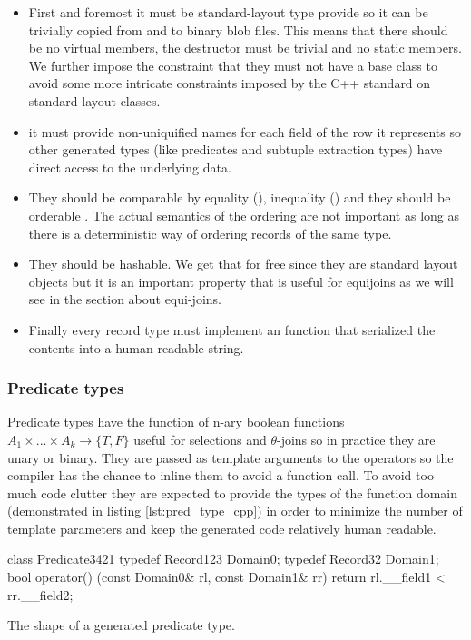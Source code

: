 \begin{itemize}
\item First and foremost it must be standard-layout type provide so it can
be trivially copied from and to binary blob files. This means that
there should be no virtual members, the destructor must be trivial
and no static members. We further impose the constraint that they
must not have a base class to avoid some more intricate constraints
imposed by the C++ standard on standard-layout classes.
\item it must provide non-uniquified names for each field of the row it
represents so other generated types (like predicates and subtuple
extraction types) have direct access to the underlying data.
\item They should be comparable by equality (\cpp{==}), inequality (\cpp{!=}) and
they should be orderable \cpp{<}. The actual semantics of the ordering
are not important as long as there is a deterministic way of
ordering records of the same type.
\item They should be hashable. We get that for free since they are
standard layout objects but it is an important property that is
useful for equijoins as we will see in the section about equi-joins.
\item Finally every record type must implement an 
function that serialized the contents into a human readable string.
\end{itemize}

\subsubsection{Predicate types}

Predicate types have the function of n-ary boolean functions \(A_1
\times ... \times A_k \to \{T,F\}\) useful for selections and
\(\theta\)-joins so in practice they are unary or binary. They are
passed as template arguments to the operators so the compiler has the
chance to inline them to avoid a function call. To avoid too much code
clutter they are expected to provide the types of the function domain
(demonstrated in listing \ref{lst:pred_type_cpp}) in order to minimize
the number of template parameters and keep the generated code
relatively human readable.

\begin{code}
\begin{cppcode}
class Predicate3421 {
  typedef Record123 Domain0;
  typedef Record32 Domain1;
  bool operator() (const Domain0& rl, const Domain1& rr) {
    return rl.__field1 < rr.__field2;
  }
}
\end{cppcode}
\caption{\label{lst:pred_type_cpp}The shape of a generated predicate type.}
\end{code}

